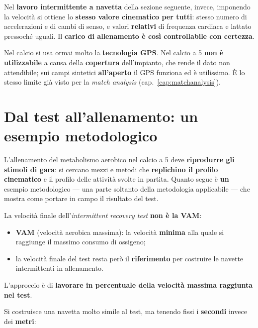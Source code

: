 Nel \textbf{lavoro intermittente a navetta} della sezione seguente, invece, imponendo la velocità si
ottiene lo \textbf{stesso valore cinematico per tutti}: stesso numero di accelerazioni e di cambi di
senso, e valori \textbf{relativi} di frequenza cardiaca e lattato pressoché uguali. Il
\textbf{carico di allenamento è così controllabile con certezza}.

Nel calcio si usa ormai molto la \textbf{tecnologia GPS}. Nel calcio a 5 \textbf{non è utilizzabile}
a causa della \textbf{copertura} dell'impianto, che rende il dato non attendibile; sui campi
sintetici \textbf{all'aperto} il GPS funziona ed è utilissimo. È lo stesso limite già visto per la
\textit{match analysis} (cap.~\ref{cap:matchanalysis}).

\section{Dal test all'allenamento: un esempio metodologico}

L'allenamento del metabolismo aerobico nel calcio a 5 deve \textbf{riprodurre gli stimoli di gara}:
si cercano mezzi e metodi che \textbf{replichino il profilo cinematico} e il profilo delle attività
svolte in partita. Quanto segue è \textbf{un} esempio metodologico --- una parte soltanto della
metodologia applicabile --- che mostra come portare in campo il risultato del test.

La velocità finale dell'\textit{intermittent recovery test} \textbf{non è la VAM}:

\begin{itemize}
  \item \textbf{VAM} (velocità aerobica massima): la velocità \textbf{minima} alla quale si raggiunge
    il massimo consumo di ossigeno;
  \item la velocità finale del test resta però il \textbf{riferimento} per costruire le navette
    intermittenti in allenamento.
\end{itemize}

L'approccio è di \textbf{lavorare in percentuale della velocità massima raggiunta nel test}.

Si costruisce una navetta molto simile al test, ma tenendo fissi i \textbf{secondi} invece dei
\textbf{metri}:

